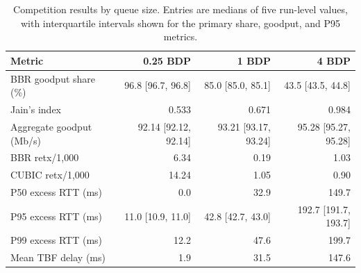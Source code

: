 \begin{table}[!htbp]
\centering
\caption{Competition results by queue size. Entries are medians of five run-level values, with interquartile intervals shown for the primary share, goodput, and P95 metrics.}
\label{tab:comp}
\vspace{4pt}
\begin{tabular}{@{}lrrr@{}}
\toprule
Metric & 0.25 BDP & 1 BDP & 4 BDP \\
\midrule
BBR goodput share (\%) & 96.8 [96.7, 96.8] & 85.0 [85.0, 85.1] & 43.5 [43.5, 44.8] \\
Jain's index & 0.533 & 0.671 & 0.984 \\
Aggregate goodput (Mb/s) & 92.14 [92.12, 92.14] & 93.21 [93.17, 93.24] & 95.28 [95.27, 95.28] \\
BBR retx/1,000 & 6.34 & 0.19 & 1.03 \\
CUBIC retx/1,000 & 14.24 & 1.05 & 0.90 \\
P50 excess RTT (ms) & 0.0 & 32.9 & 149.7 \\
P95 excess RTT (ms) & 11.0 [10.9, 11.0] & 42.8 [42.7, 43.0] & 192.7 [191.7, 193.7] \\
P99 excess RTT (ms) & 12.2 & 47.6 & 199.7 \\
Mean TBF delay (ms) & 1.9 & 31.5 & 147.6 \\
\bottomrule
\end{tabular}
\end{table}

